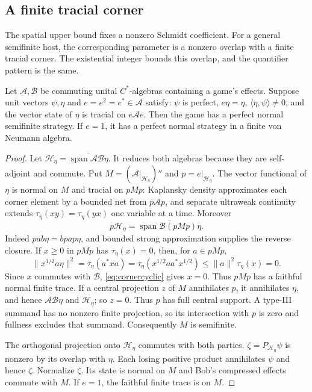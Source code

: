 \subsection{A finite tracial corner}\label{sec:cornerupper}
The spatial upper bound fixes a nonzero Schmidt coefficient. For a general semifinite host, the corresponding parameter is a nonzero overlap with a finite tracial corner. The existential integer bounds this overlap, and the quantifier pattern is the same.

\begin{lemma}\label{lem:overlap}
Let $\mathcal A,\mathcal B$ be commuting unital $C^*$-algebras containing a game's effects. Suppose unit vectors $\psi,\eta$ and $e=e^2=e^*\in\mathcal A$ satisfy: $\psi$ is perfect, $e\eta=\eta$, $\langle\eta,\psi\rangle\ne0$, and the vector state of $\eta$ is tracial on $e\mathcal A e$. Then the game has a perfect normal semifinite strategy. If $e=1$, it has a perfect normal strategy in a finite von Neumann algebra.
\end{lemma}
\begin{proof}
Let $\mathcal H_\eta=\overline{\operatorname{span}\mathcal A\mathcal B\eta}$. It reduces both algebras because they are self-adjoint and commute. Put $M=(\mathcal A|_{\mathcal H_\eta})''$ and $p=e|_{\mathcal H_\eta}$. The vector functional of $\eta$ is normal on $M$ and tracial on $pMp$: Kaplansky density approximates each corner element by a bounded net from $p\mathcal A p$, and separate ultraweak continuity extends $\tau_\eta(xy)=\tau_\eta(yx)$ one variable at a time. Moreover
\begin{equation}\label{eq:cornercyclic}
 p\mathcal H_\eta=\overline{\operatorname{span}\mathcal B(pMp)\eta}.
\end{equation}
Indeed $pab\eta=bpap\eta$, and bounded strong approximation supplies the reverse closure. If $x\geq0$ in $pMp$ has $\tau_\eta(x)=0$, then, for $a\in pMp$,
\[
 \|x^{1/2}a\eta\|^2=\tau_\eta(a^*xa)
 =\tau_\eta(x^{1/2}aa^*x^{1/2})\leq\|a\|^2\tau_\eta(x)=0.
\]
Since $x$ commutes with $\mathcal B$, \eqref{eq:cornercyclic} gives $x=0$. Thus $pMp$ has a faithful normal finite trace. If a central projection $z$ of $M$ annihilates $p$, it annihilates $\eta$, and hence $\mathcal A\mathcal B\eta$ and $\mathcal H_\eta$; so $z=0$. Thus $p$ has full central support. A type-III summand has no nonzero finite projection, so its intersection with $p$ is zero and fullness excludes that summand. Consequently $M$ is semifinite.

The orthogonal projection onto $\mathcal H_\eta$ commutes with both parties. $\zeta=P_{\mathcal H_\eta}\psi$ is nonzero by its overlap with $\eta$. Each losing positive product annihilates $\psi$ and hence $\zeta$. Normalize $\zeta$. Its state is normal on $M$ and Bob's compressed effects commute with $M$. If $e=1$, the faithful finite trace is on $M$.
\end{proof}

